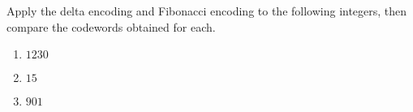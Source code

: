\documentclass{subfiles}
\begin{document}
    \begin{exercise}
        Apply the delta encoding and Fibonacci encoding to the following integers,
            then compare the codewords obtained for each.
        \begin{enumerate}
            \item \(1230\)
            \item \(15\)
            \item \(901\)
        \end{enumerate}
    \end{exercise}
\end{document}
